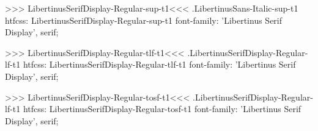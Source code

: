 {{{{>>>
\<LibertinusSerifDisplay-Regular-sup-t1\><<<
.LibertinusSans-Italic-sup-t1
htfcss:  LibertinusSerifDisplay-Regular-sup-t1  font-family: 'Libertinus Serif Display', serif;

>>>
\<LibertinusSerifDisplay-Regular-tlf-t1\><<<
.LibertinusSerifDisplay-Regular-lf-t1
htfcss:  LibertinusSerifDisplay-Regular-tlf-t1  font-family: 'Libertinus Serif Display', serif;

>>>
\<LibertinusSerifDisplay-Regular-tosf-t1\><<<
.LibertinusSerifDisplay-Regular-lf-t1
htfcss:  LibertinusSerifDisplay-Regular-tosf-t1  font-family: 'Libertinus Serif Display', serif;

}}}}
